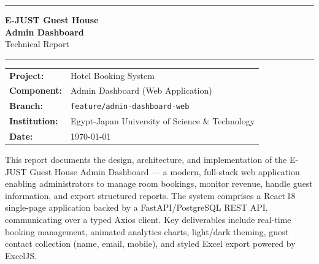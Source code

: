 \documentclass[12pt,a4paper]{report}
\begin{document}
\begin{titlepage}
  \centering
  \vspace*{2cm}

  {\color{brand}\rule{\linewidth}{2pt}}
  \vspace{0.5cm}

  {\Huge\bfseries\color{dark} E-JUST Guest House}\\[0.6em]
  {\LARGE\bfseries\color{brand} Admin Dashboard}\\[0.4em]
  {\Large\color{muted} Technical Report}

  \vspace{0.5cm}
  {\color{brand}\rule{\linewidth}{0.8pt}}

  \vspace{2cm}

  \begin{tabular}{ll}
    \textbf{Project:}    & Hotel Booking System \\[0.4em]
    \textbf{Component:}  & Admin Dashboard (Web Application) \\[0.4em]
    \textbf{Branch:}     & \texttt{feature/admin-dashboard-web} \\[0.4em]
    \textbf{Institution:} & Egypt-Japan University of Science \& Technology \\[0.4em]
    \textbf{Date:}       & \today \\[0.4em]
  \end{tabular}

  \vfill

  \begin{featurebox}[title=Abstract]
    This report documents the design, architecture, and implementation of the
    E-JUST Guest House Admin Dashboard — a modern, full-stack web application
    enabling administrators to manage room bookings, monitor revenue, handle
    guest information, and export structured reports. The system comprises a
    React\,18 single-page application backed by a FastAPI/PostgreSQL REST API,
    communicating over a typed Axios client. Key deliverables include real-time
    booking management, animated analytics charts, light/dark theming, guest
    contact collection (name, email, mobile), and styled Excel export powered
    by ExcelJS.
  \end{featurebox}

  \vspace{1.5cm}
\end{titlepage}
\end{document}
